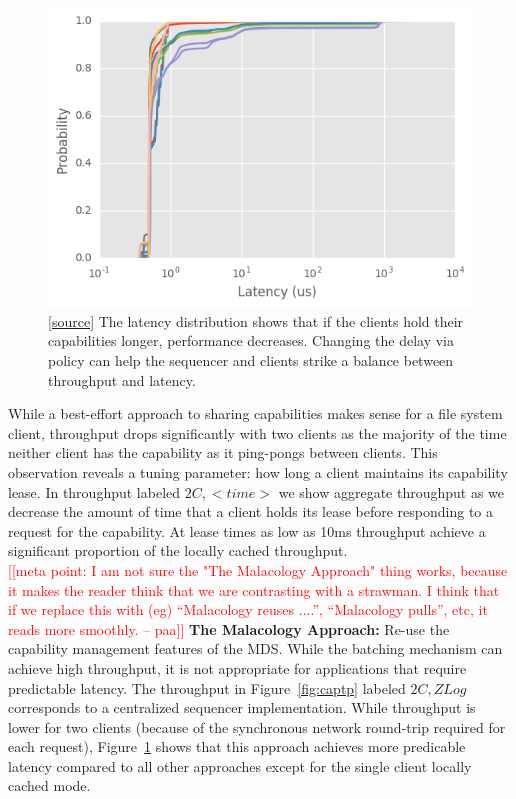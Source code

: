 \documentclass[preprint]{sigplanconf-eurosys}
\newcommand{\paa}[1]{{\textcolor{red}{[[#1 -- paa]]}}}
\begin{document}
\begin{figure}[h]
\centering
\includegraphics{figures/caps-delay-latency.png}
\caption{[\href{https://github.com/double-blind-submitter/osdi16}{source}] The
latency distribution shows that if the clients hold their capabilities longer,
performance decreases. Changing the delay via policy can help the sequencer and
clients strike a balance between throughput and latency.}
\label{fig:capcdf}
\end{figure}

While a best-effort approach to sharing capabilities makes sense for a file
system client, throughput drops significantly with two clients as the majority
of the time neither client has the capability as it ping-pongs between
clients. This observation reveals a tuning parameter: how long a client
maintains its capability lease. In throughput labeled $2C,<time>$ we show
aggregate throughput as we decrease the amount of time that a client holds its
lease before responding to a request for the capability.  At lease times as
low as 10ms throughput achieve a significant proportion of the locally cached
throughput.\\

\paa{meta point: I am not sure the "The Malacology Approach" thing works, because it
makes the reader think that we are contrasting with a strawman. I think that if we replace this with (eg)
``Malacology reuses ....'', ``Malacology pulls'', etc, it reads more smoothly.}
\noindent\textbf{The Malacology Approach:} Re-use the capability management
features of the MDS.  While the batching mechanism can achieve high throughput,
it is not appropriate for applications that require predictable latency. The
throughput in Figure~\ref{fig:captp} labeled $2C,ZLog$ corresponds to a
centralized sequencer implementation. While throughput is lower for two clients
(because of the synchronous network round-trip required for each request),
Figure~\ref{fig:capcdf} shows that this approach achieves more predicable
latency compared to all other approaches except for the single client locally
cached mode.\\
\end{document}
